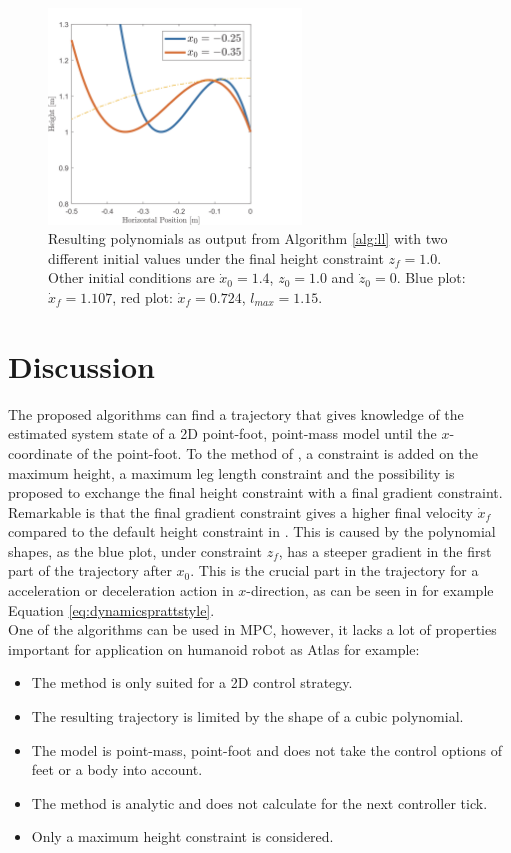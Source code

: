\begin{figure}[h]
\centering
\includegraphics[width=0.6\textwidth]{STYLESTUFF/polynomialLengthViz.png}
\caption{Resulting polynomials as output from Algorithm \ref{alg:ll} with two different initial values under the final height constraint $z_f=1.0$. Other initial conditions are $\dot{x}_0=1.4$, $z_0=1.0$ and $\dot{z}_0=0$. Blue plot: $\dot{x}_f=1.107$, red plot: $\dot{x}_f=0.724$, $l_{max}=1.15$. }
\label{fig:pollength}
\end{figure}
\section{Discussion}
The proposed algorithms can find a trajectory that gives knowledge of the estimated system state of a \ac{2D} point-foot, point-mass model until the $x$-coordinate of the point-foot. To the method of \cite{koolen2016balance}, a constraint is added on the maximum height, a maximum leg length constraint and the possibility is proposed to exchange the final height constraint with a final gradient constraint. Remarkable is that the final gradient constraint gives a higher final velocity $\dot{x}_f$ compared to the default height constraint in . This is caused by the polynomial shapes, as the blue plot, under constraint $z_f$, has a steeper gradient in the first part of the trajectory after $x_0$. This is the crucial part in the trajectory for a acceleration or deceleration action in $x$-direction, as can be seen in for example Equation \eqref{eq:dynamicsprattstyle}. \\
One of the algorithms can be used in \ac{MPC}, however, it lacks a lot of properties important for application on humanoid robot as Atlas for example:
\begin{itemize}
	\item The method is only suited for a \ac{2D} control strategy.
	\item The resulting trajectory is limited by the shape of a cubic polynomial.
	\item The model is point-mass, point-foot and does not take the control options of feet or a body into account.
	\item The method is analytic and does not calculate for the next controller tick.
	\item Only a maximum height constraint is considered.
\end{itemize}
